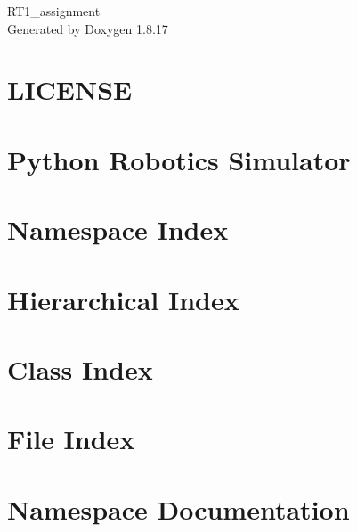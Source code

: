 \let\mypdfximage\pdfximage\def\pdfximage{\immediate\mypdfximage}\documentclass[twoside]{book}
\newcommand{\+}{\discretionary{\mbox{\scriptsize$\hookleftarrow$}}{}{}}
\newcommand{\clearemptydoublepage}{%
  \newpage{\pagestyle{empty}\cleardoublepage}%
}
\begin{document}
\hypersetup{pageanchor=false,
             bookmarksnumbered=true,
             pdfencoding=unicode
            }
\begin{titlepage}
\vspace*{7cm}
\begin{center}%
{\Large R\+T1\+\_\+assignment }\\
\vspace*{1cm}
{\large Generated by Doxygen 1.8.17}\\
\end{center}
\end{titlepage}
\clearemptydoublepage
{}
\tableofcontents
\clearemptydoublepage
{}
\hypersetup{pageanchor=true}

\chapter{L\+I\+C\+E\+N\+SE}
\label{md__l_i_c_e_n_s_e}

\chapter{Python Robotics Simulator}
\label{md__r_e_a_d_m_e}

\chapter{Namespace Index}

\chapter{Hierarchical Index}

\chapter{Class Index}

\chapter{File Index}

\chapter{Namespace Documentation}




















\end{document}
